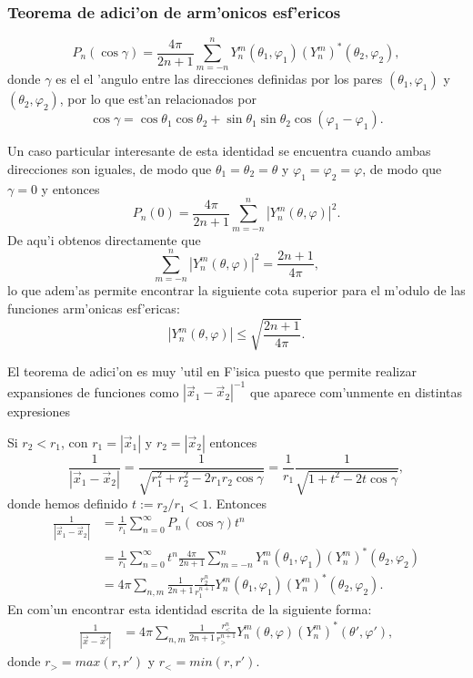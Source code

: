 \subsubsection{Teorema de adici'on de arm'onicos esf'ericos}
\begin{equation}
P_n(\cos\gamma) = \frac{4\pi}{2n+1} \sum_{m=-n}^n Y_n^m(\theta_1,\varphi_1)(Y_n^{m})^\ast(\theta_2,\varphi_2),
\end{equation}
donde $\gamma$ es el el 'angulo entre las direcciones definidas por los pares $(\theta_1,\varphi_1)$ y $(\theta_2,\varphi_2)$, por lo que est'an relacionados por
\begin{equation}
\cos\gamma = \cos\theta_1\cos\theta_2 + \sin\theta_1\sin\theta_2\cos(\varphi_1-\varphi_1).
\end{equation}

Un caso particular interesante de esta identidad se encuentra cuando ambas direcciones son iguales, de modo que  $\theta_1=\theta_2=\theta$ y $\varphi_1=\varphi_2=\varphi$, de modo que $\gamma=0$ y entonces
\begin{equation}
P_n(0) = \frac{4\pi}{2n+1} \sum_{m=-n}^n \left|Y_n^m(\theta,\varphi)\right|^2.
\end{equation}
De aqu'i obtenos directamente que
\begin{equation}
\sum_{m=-n}^n \left|Y_n^m(\theta,\varphi)\right|^2 = \frac{2n+1}{4\pi},
\end{equation}
lo que adem'as permite encontrar la siguiente cota superior para el m'odulo de las funciones arm'onicas esf'ericas:
\begin{equation}
\left|Y_n^m(\theta,\varphi)\right| \le \sqrt{\frac{2n+1}{4\pi}}.
\end{equation}

El teorema de adici'on es muy 'util en F'isica puesto que permite realizar expansiones de funciones como $\left|\vec{x}_1-\vec{x}_2\right|^{-1}$ que aparece com'unmente en distintas expresiones

Si $r_2<r_1$, con $r_1=\left|\vec{x}_1\right|$ y $r_2=\left|\vec{x}_2\right|$ entonces
\begin{equation}
\frac{1}{\left|\vec{x}_1-\vec{x}_2\right|} = \frac{1}{\sqrt{r_1^2+r_2^2-2r_1r_2\cos\gamma}} = \frac{1}{r_1}\frac{1}{\sqrt{1+t^2-2t\cos\gamma}},
\end{equation}
donde hemos definido $t:=r_2/r_1 <1$. Entonces
\begin{align}
\frac{1}{\left|\vec{x}_1-\vec{x}_2\right|} &= \frac{1}{r_1}\sum_{n=0}^\infty P_n(\cos\gamma)t^n \\
&= \frac{1}{r_1}\sum_{n=0}^\infty t^n\frac{4\pi}{2n+1} \sum_{m=-n}^n Y_n^m(\theta_1,\varphi_1)(Y_n^{m})^\ast(\theta_2,\varphi_2)  \\
&= 4\pi \sum_{n,m}\frac{1}{2n+1}\frac{r_2^n}{r_1^{n+1}} Y_n^m(\theta_1,\varphi_1)(Y_n^{m})^\ast(\theta_2,\varphi_2).
\end{align}
En com'un encontrar esta identidad escrita de la siguiente forma:
\begin{align}
\frac{1}{\left|\vec{x}-\vec{x}'\right|} 
&= 4\pi \sum_{n,m}\frac{1}{2n+1}\frac{r_<^n}{r_>^{n+1}}Y_n^m(\theta,\varphi)(Y_n^{m})^\ast(\theta',\varphi'),
\end{align}
donde $r_> = max(r,r')$ y $r_< = min(r,r')$.

